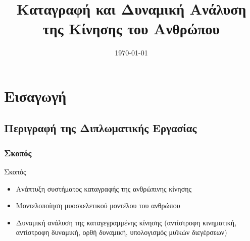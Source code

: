 \documentclass[8pt,sans,mathserif]{beamer}%
\title[Καταγραφή και Δυναμική Ανάλυση της Κίνησης του Ανθρώπου]{Καταγραφή και Δυναμική Ανάλυση της Κίνησης του Ανθρώπου}
\institute[ΗΜ\&ΤΥ]{
{\large\textsc{Πανεπιστήμιο Πατρών \\
Τμήμα Ηλεκτρολόγων Μηχανικών και Τεχνολογίας Υπολογιστών}}\\[1cm]
{\large\eng{Stanev Dimitar}}\\
\medskip
\textit{\eng{jimstanev@gmail.com}} %
}
\date{\today} %
\begin{document}

\begin{frame}
\titlepage %
\end{frame}


%


\section{Εισαγωγή}
\frame{\tableofcontents[currentsection]}
\subsection{Περιγραφή της Διπλωματικής Εργασίας}
\begin{frame}
\frametitle{Σκοπός}

    \begin{block}{Σκοπός}
        \begin{itemize}
            \item Ανάπτυξη συστήματος καταγραφής της ανθρώπινης κίνησης
            \item Μοντελοποίηση μυοσκελετικού μοντέλου του ανθρώπου
            \item Δυναμική ανάλυση της καταγεγραμμένης κίνησης (αντίστροφη κινηματική, αντίστροφη δυναμική, ορθή δυναμική, υπολογισμός μυϊκών διεγέρσεων)
        \end{itemize}
    \end{block}

\end{frame}
\end{document}
